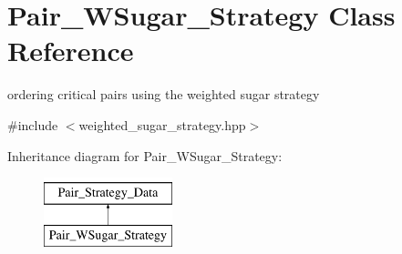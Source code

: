 \hypertarget{class_pair___w_sugar___strategy}{}\section{Pair\+\_\+\+W\+Sugar\+\_\+\+Strategy Class Reference}
\label{class_pair___w_sugar___strategy}


ordering critical pairs using the weighted sugar strategy  




{\ttfamily \#include $<$weighted\+\_\+sugar\+\_\+strategy.\+hpp$>$}

Inheritance diagram for Pair\+\_\+\+W\+Sugar\+\_\+\+Strategy\+:\begin{figure}[H]
\begin{center}
\leavevmode
\includegraphics[height=2.000000cm]{class_pair___w_sugar___strategy}
\end{center}
\end{figure}
